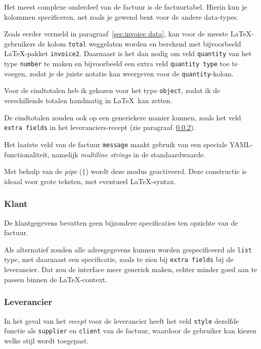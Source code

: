 Het meest complexe onderdeel van de factuur is de factuurtabel.
Hierin kun je kolommen specificeren, net zoals je gewend bent voor de andere data-types.

Zoals eerder vermeld in paragraaf~\ref{sec:invoice data}, kan voor de meeste \LaTeX-gebruikers de kolom \texttt{total} weggelaten worden en berekend met bijvoorbeeld \LaTeX-pakket \texttt{invoice2}.
Daarnaast is het dan nodig om veld \texttt{quantity} van het type \texttt{number} te maken en bijvoorbeeld een extra veld \texttt{quantity type} toe te voegen, zodat je de juiste notatie kan weergeven voor de \texttt{quantity}-kolom.

Voor de eindtotalen heb ik gekozen voor het type \texttt{object}, zodat ik de verschillende totalen handmatig in \LaTeX\ kan zetten.

De eindtotalen zouden ook op een generiekere manier kunnen, zoals het veld \texttt{extra fields} in het leveranciers-recept (zie paragraaf~\ref{sec:supplier spec}).


Het laatste veld van de factuur \texttt{message} maakt gebruik van een speciale YAML-functionaliteit, namelijk \textit{multiline strings} in de standaardwaarde.

Met behulp van de \textit{pipe} (\texttt{|}) wordt deze modus geactiveerd.
Deze constructie is ideaal voor grote teksten, met eventueel \LaTeX-syntax.

\subsubsection{Klant}
De klantgegevens bevatten geen bijzondere specificaties ten opzichte van de factuur.

Als alternatief zouden alle adresgegevens kunnen worden gespecificeerd als \texttt{list} type, met daarnaast een specificatie, zoals te zien bij \texttt{extra fields} bij de leverancier.
Dat zou de interface meer generiek maken, echter minder goed aan te passen binnen de \LaTeX-context.

\subsubsection{Leverancier}\label{sec:supplier spec}
In het geval van het \textit{recept} voor de leverancier heeft het veld \texttt{style} dezelfde functie als \texttt{supplier} en \texttt{client} van de factuur, waardoor de gebruiker kan kiezen welke stijl wordt toegepast.


